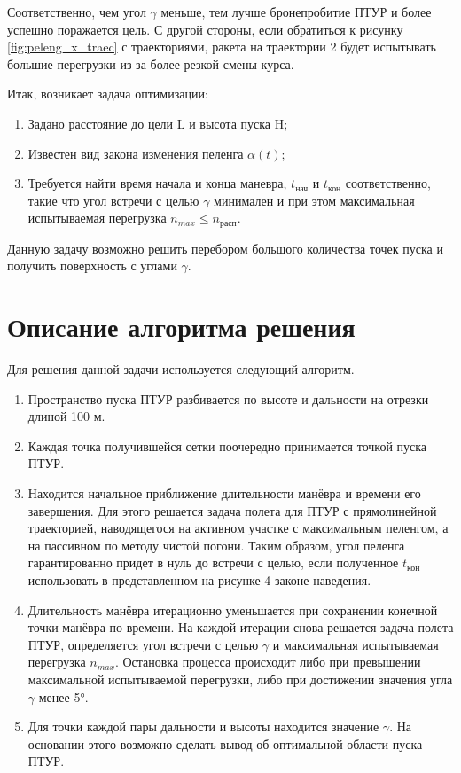 Соответственно, чем угол $\gamma$ меньше, тем лучше бронепробитие ПТУР и более успешно поражается цель. С другой стороны, если обратиться к рисунку \ref{fig:peleng_x_traec} с траекториями, ракета на траектории 2 будет испытывать большие перегрузки из-за более резкой смены курса. 

\clearpage
Итак, возникает задача оптимизации:
\begin{enumerate}[1.]
	\item Задано расстояние до цели L и высота пуска H;
	\item Известен вид закона изменения пеленга $\alpha (t)$;
	\item Требуется найти время начала и конца маневра, $t_\text{нач}$ и $t_\text{кон}$ соответственно, такие что угол встречи с целью $\gamma$ минимален и при этом максимальная испытываемая перегрузка $n_{max} ≤ n_\text{расп}$.
\end{enumerate}

Данную задачу возможно решить перебором большого количества точек пуска и получить поверхность с углами $\gamma$.

\section{Описание алгоритма решения}
Для решения данной задачи используется следующий алгоритм.
\begin{enumerate}[1.]
	\item Пространство пуска ПТУР разбивается по высоте и дальности на отрезки длиной 100 м.
	\item Каждая точка получившейся сетки поочередно принимается точкой пуска ПТУР. 
	\item Находится начальное приближение длительности манёвра и времени его завершения. Для этого решается задача полета для ПТУР с прямолинейной траекторией, наводящегося на активном участке с максимальным пеленгом, а на пассивном по методу чистой погони. Таким образом, угол пеленга гарантированно придет в нуль до встречи с целью, если полученное $t_\text{кон}$  использовать в представленном на рисунке 4 законе наведения. 
	\item Длительность манёвра итерационно уменьшается при сохранении конечной точки манёвра по времени. На каждой итерации снова решается задача полета ПТУР, определяется угол встречи с целью $\gamma$ и максимальная испытываемая перегрузка $n_{max}$. Остановка процесса происходит либо при превышении максимальной испытываемой перегрузки, либо при достижении значения угла $\gamma$ менее 5°.
	\item Для точки каждой пары дальности и высоты находится значение $\gamma$. На основании этого возможно сделать вывод об оптимальной области пуска ПТУР.
\end{enumerate}

